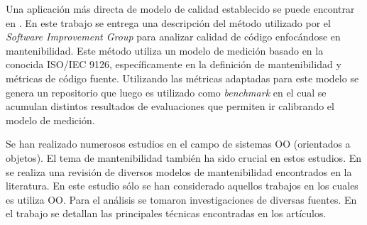 Una aplicación más directa de modelo de calidad establecido se puede encontrar en
\cite{Baggen:2012}. En este trabajo se entrega una descripción del método utilizado
por el \textit{Software Improvement Group} para analizar calidad de código
enfocándose en mantenibilidad. Este método utiliza un modelo de medición
basado en la conocida ISO/IEC 9126, específicamente en la definición de mantenibilidad
y métricas de código fuente. Utilizando las métricas adaptadas para este modelo
se genera un repositorio que luego es utilizado como \textit{benchmark} en
el cual se acumulan distintos resultados de evaluaciones que permiten
ir calibrando el modelo de medición.

Se han realizado numerosos estudios en el campo de sistemas OO (orientados a objetos). El tema
de mantenibilidad también ha sido crucial en estos estudios. En \cite{Kumar:2011}
se realiza una revisión de diversos modelos de mantenibilidad 
encontrados en la literatura. En este estudio sólo se han considerado
aquellos trabajos en los cuales es utiliza OO. Para el análisis se
tomaron investigaciones de diversas fuentes. En el trabajo se detallan
las principales técnicas encontradas en los artículos.
